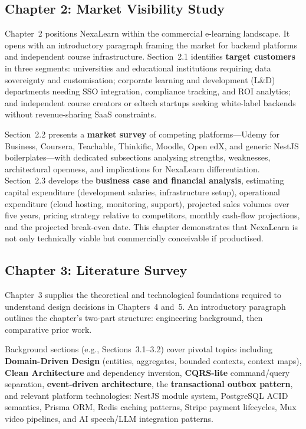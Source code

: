 \subsection{Chapter 2: Market Visibility Study}
\label{subsec:doc-ch2}

Chapter~2 positions NexaLearn within the commercial e-learning landscape. It opens with an introductory paragraph framing the market for backend platforms and independent course infrastructure. Section~2.1 identifies \textbf{target customers} in three segments: universities and educational institutions requiring data sovereignty and customisation; corporate learning and development (L\&D) departments needing SSO integration, compliance tracking, and ROI analytics; and independent course creators or edtech startups seeking white-label backends without revenue-sharing SaaS constraints.

Section~2.2 presents a \textbf{market survey} of competing platforms---Udemy for Business, Coursera, Teachable, Thinkific, Moodle, Open edX, and generic NestJS boilerplates---with dedicated subsections analysing strengths, weaknesses, architectural openness, and implications for NexaLearn differentiation. Section~2.3 develops the \textbf{business case and financial analysis}, estimating capital expenditure (development salaries, infrastructure setup), operational expenditure (cloud hosting, monitoring, support), projected sales volumes over five years, pricing strategy relative to competitors, monthly cash-flow projections, and the projected break-even date. This chapter demonstrates that NexaLearn is not only technically viable but commercially conceivable if productised.

\subsection{Chapter 3: Literature Survey}
\label{subsec:doc-ch3}

Chapter~3 supplies the theoretical and technological foundations required to understand design decisions in Chapters~4 and~5. An introductory paragraph outlines the chapter's two-part structure: engineering background, then comparative prior work.

Background sections (e.g., Sections~3.1--3.2) cover pivotal topics including \textbf{Domain-Driven Design} (entities, aggregates, bounded contexts, context maps), \textbf{Clean Architecture} and dependency inversion, \textbf{CQRS-lite} command/query separation, \textbf{event-driven architecture}, the \textbf{transactional outbox pattern}, and relevant platform technologies: NestJS module system, PostgreSQL ACID semantics, Prisma ORM, Redis caching patterns, Stripe payment lifecycles, Mux video pipelines, and AI speech/LLM integration patterns.

